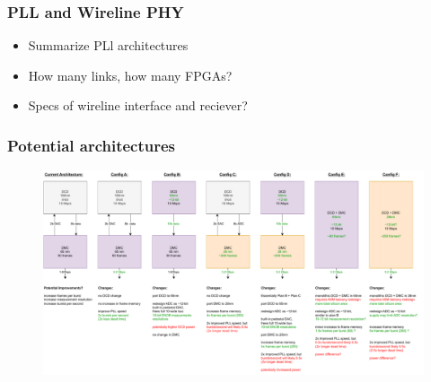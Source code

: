 \documentclass{beamer}
\begin{document}
\begin{frame}
    \frametitle{PLL and Wireline PHY}
    \begin{itemize}
    \item Summarize PLl architectures
    \item How many links, how many FPGAs?
    \item Specs of wireline interface and reciever?
    \end{itemize}
\end{frame}



\begin{frame}
    \frametitle{Potential architectures}
    \begin{figure}
    \includegraphics[width=\textwidth]{edet_architectures.drawio.pdf}
    \end{figure}
\end{frame}
\end{document}
